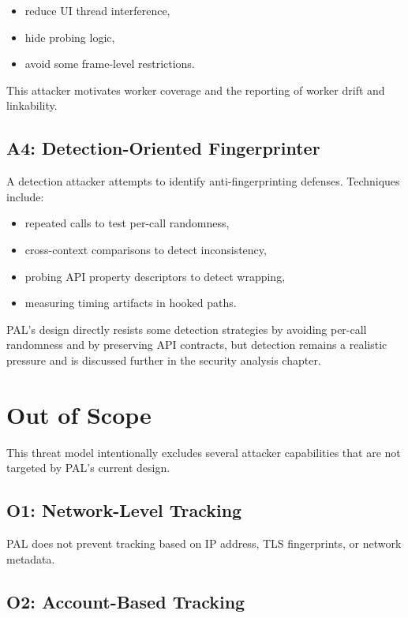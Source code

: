 \documentclass[11pt]{report}
\begin{document}
\begin{itemize}
    \item reduce UI thread interference,
    \item hide probing logic,
    \item avoid some frame-level restrictions.
\end{itemize}

This attacker motivates worker coverage and the reporting of worker drift and linkability.

\subsection{A4: Detection-Oriented Fingerprinter}

A detection attacker attempts to identify anti-fingerprinting defenses. Techniques include:

\begin{itemize}
    \item repeated calls to test per-call randomness,
    \item cross-context comparisons to detect inconsistency,
    \item probing API property descriptors to detect wrapping,
    \item measuring timing artifacts in hooked paths.
\end{itemize}

PAL’s design directly resists some detection strategies by avoiding per-call randomness and by preserving API contracts, but detection remains a realistic pressure and is discussed further in the security analysis chapter.

\section{Out of Scope}

This threat model intentionally excludes several attacker capabilities that are not targeted by PAL’s current design.

\subsection{O1: Network-Level Tracking}

PAL does not prevent tracking based on IP address, TLS fingerprints, or network metadata.

\subsection{O2: Account-Based Tracking}
\end{document}
